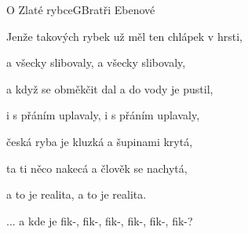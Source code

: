 \begin{song}{O Zlaté rybce}{G}{Bratři Ebenové}
\begin{SBVerse}

Jenže takových rybek už měl ten chlápek v hrsti,

a všecky slibovaly, a všecky slibovaly,

a když se obměkčit dal a do vody je pustil,

i s přáním uplavaly, i s přáním uplavaly,

česká ryba je kluzká a šupinami krytá,

ta ti něco nakecá a člověk se nachytá,

a to je realita, a to je realita.

\end{SBVerse}

\begin{SBChorus}

... a kde je fik-, fik-, fik-, fik-, fik-, fik-?

\end{SBChorus}
\end{song}
\clearpage
